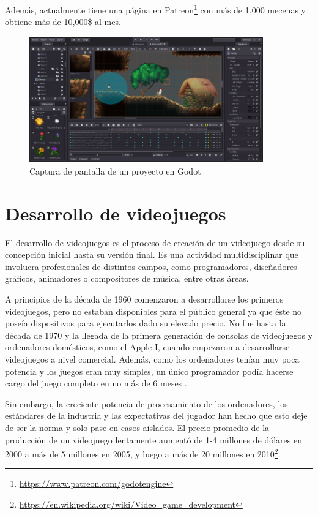 Además, actualmente tiene una página en Patreon\footnote{\url{https://www.patreon.com/godotengine}} con más de 1,000 mecenas y obtiene más de 10,000\$ al mes.

\begin{figure}[!h]
\begin{center}
\includegraphics[width=0.9\textwidth]{imagenes/2/godot.jpg}
\caption{Captura de pantalla de un proyecto en Godot}
\label{fig:godot}
\end{center}
\end{figure}

\section{Desarrollo de videojuegos}

El desarrollo de videojuegos es el proceso de creación de un videojuego desde su concepción inicial hasta su versión final. Es una actividad multidisciplinar que involucra profesionales de distintos campos, como programadores, diseñadores gráficos, animadores o compositores de música, entre otras áreas.

A principios de la década de 1960 comenzaron a desarrollarse los primeros videojuegos, pero no estaban disponibles para el público general ya que éste no poseía dispositivos para ejecutarlos dado su elevado precio. No fue hasta la década de 1970 y la llegada de la primera generación de consolas de videojuegos y ordenadores domésticos, como el Apple I, cuando empezaron a desarrollarse videojuegos a nivel comercial. Además, como los ordenadores tenían muy poca potencia y los juegos eran muy simples, un único programador podía hacerse cargo del juego completo en no más de 6 meses \cite{next-gen-97}.

Sin embargo, la creciente potencia de procesamiento de los ordenadores, los estándares de la industria y las expectativas del jugador han hecho que esto deje de ser la norma y solo pase en casos aislados. El precio promedio de la producción de un videojuego lentamente aumentó de 1-4 millones de dólares en 2000 a más de 5 millones en 2005, y luego a más de 20 millones en 2010\footnote{\url{https://en.wikipedia.org/wiki/Video_game_development}}.

